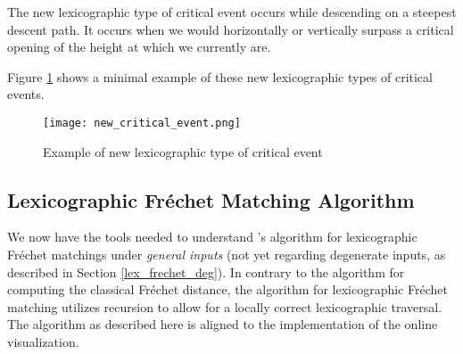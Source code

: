 The new lexicographic type of critical event occurs while descending on a steepest descent path. It occurs when we would horizontally or vertically surpass a critical opening of the height at which we currently are.

Figure \ref{fig:new_critical_event} shows a minimal example of these new lexicographic types of critical events.

\begin{figure}[H]
    \centering
    
	\texttt{[image: new\_critical\_event.png]}
	
	\caption{Example of new lexicographic type of critical event\protect\footnotemark}
    \label{fig:new_critical_event}
\end{figure}


\subsection{Lexicographic Fréchet Matching Algorithm}\label{sec:lex_frechet_alg}

We now have the tools needed to understand \citeauthor{rotelex}'s algorithm for lexicographic Fréchet matchings\cite{rotelex} under \textit{general inputs} (not yet regarding degenerate inputs, as described in Section \ref{lex_frechet_deg}). In contrary to the algorithm for computing the classical Fréchet distance, the algorithm for lexicographic Fréchet matching utilizes recursion to allow for a locally correct lexicographic traversal. The algorithm as described here is aligned to the implementation of the online visualization.

